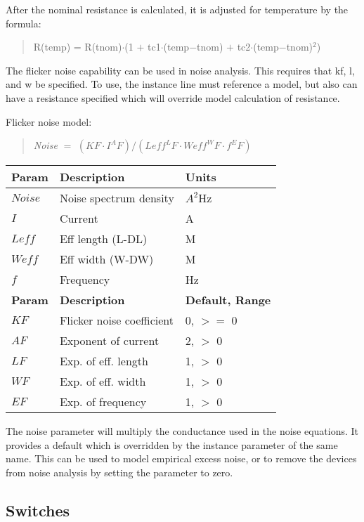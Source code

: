 After the nominal resistance is calculated, it is adjusted for
temperature by the formula:
\begin{quote}
R{\vt (temp)} = R{\vt (tnom)}$\cdot${\vt (1 $+$ tc1$\cdot$(temp$-$tnom) $+$
 tc2$\cdot$(temp$-$tnom)$^2$)}
\end{quote}

The flicker noise capability can be used in noise analysis.  This
requires that {\vt kf}, {\vt l}, and {\vt w} be specified.  To use,
the instance line must reference a model, but also can have a
resistance specified which will override model calculation of
resistance.

Flicker noise model:
\begin{quote}
    {\it Noise} $=$ $(KF \cdot I^AF) / (Leff^LF \cdot Weff^WF \cdot f^EF)$
\end{quote}

\begin{tabular}{|l|l|l|}\hline

\bf Param & \bf Description & \bf Units\\ \hline
$Noise$ & Noise spectrum density & $A^2$Hz\\ \hline
$I$ &    Current           &  A\\ \hline
$Leff$ & Eff length (L-DL) &  M\\ \hline
$Weff$ & Eff width  (W-DW) &  M\\ \hline
$f$ &    Frequency         &  Hz\\ \hline
\bf Param & \bf Description & \bf Default, Range\\ \hline
$KF$ &   Flicker noise coefficient & 0,  $>=$ 0\\ \hline
$AF$ &   Exponent of current & 2,  $>$ 0\\ \hline
$LF$ &   Exp. of eff. length & 1,  $>$ 0\\ \hline
$WF$ &   Exp. of eff. width & 1,  $>$ 0\\ \hline
$EF$ &   Exp. of frequency & 1,  $>$ 0\\ \hline
\end{tabular}

The {\vt noise} parameter will multiply the conductance used in the
noise equations.  It provides a default which is overridden by the
instance parameter of the same name.  This can be used to model
empirical excess noise, or to remove the devices from noise analysis
by setting the parameter to zero.


\subsection{Switches}

